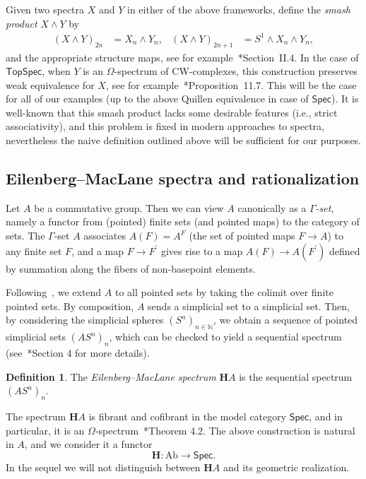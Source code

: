 \documentclass[a4paper,reqno]{amsart}
\theoremstyle{plain}
\theoremstyle{definition}
\newtheorem{definition}[theorem]{Definition}
\theoremstyle{remark}
\numberwithin{equation}{section}
\newcommand{\dN}{\mathbb{N}}
\newcommand{\bH}{\mathbf{H}}
\newcommand{\Ab}{\mathrm{Ab}}
\newcommand{\Spec}{\mathsf{Spec}}
\newcommand{\TopSpec}{\mathsf{TopSpec}}
\begin{document}
Given two spectra $X$ and $Y$ in either of the above frameworks, define the \emph{smash product} $X \wedge Y$ by
\begin{align*}
(X \wedge Y)_{2n} &= X_n \wedge Y_n,&
(X \wedge Y)_{2n + 1} &= S^1 \wedge X_n \wedge Y_n,
\end{align*}
and the appropriate structure maps, see for example~\cite{adams:shgh}*{Section~II.4}.
In the case of $\TopSpec$, when $Y$ is an $\Omega$-spectrum of CW-complexes, this construction preserves weak equivalence for $X$, see for example~\cite{MR1806878}*{Proposition~11.7}.
This will be the case for all of our examples (up to the above Quillen equivalence in case of $\Spec$). It is well-known that this smash product lacks some desirable features (i.e., strict associativity), and this problem is fixed in modern approaches to spectra, nevertheless the naive definition outlined above will be sufficient for our purposes.

\subsection{Eilenberg--MacLane spectra and rationalization}

Let $A$ be a commutative group.
Then we can view $A$ canonically as a \emph{$\Gamma$-set}, namely a functor from (pointed) finite sets (and pointed maps) to the category of sets.
The $\Gamma$-set $A$ associates $A(F) = A^F$ (the set of pointed maps $F\to A$) to any finite set $F$, and a map $F\to F^\prime$ gives rise to a map $A(F)\to A(F^\prime)$ defined by summation along the fibers of non-basepoint elements.

Following~\cite{bf:spectra}, we extend $A$ to all pointed sets by taking the colimit over finite pointed sets.
By composition, $A$ sends a simplicial set to a simplicial set.
Then, by considering the simplicial spheres $(S^n)_{n\in\dN}$, we obtain a sequence of pointed simplicial sets $(AS^n)_n$, which can be checked to yield a sequential spectrum (see~\cite{bf:spectra}*{Section 4} for more details). 

\begin{definition}
The \emph{Eilenberg--MacLane spectrum} $\bH A$ is the sequential spectrum $(AS^n)_n$.
\end{definition} 

The spectrum $\bH A$ is fibrant and cofibrant in the model category $\Spec$, and in particular, it is an $\Omega$-spectrum~\cite{bf:spectra}*{Theorem 4.2}.
The above construction is natural in $A$, and we consider it a functor
\[
\bH \colon \Ab \to \Spec.
\]
In the sequel we will not distinguish between $\bH A$ and its geometric realization.
\end{document}
